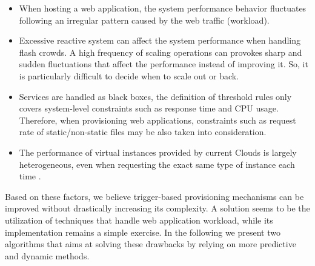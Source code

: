 \begin{itemize}
\item  When hosting a web application, the system performance behavior fluctuates following an irregular pattern caused by the web traffic (workload). 


\item Excessive reactive system can affect the system performance when handling flash crowds. A high frequency of scaling operations can provokes sharp and sudden fluctuations that affect the performance instead of improving it. So, it is particularly difficult to decide when to scale out or back. 

\item Services are handled as black boxes, the definition of threshold rules only covers system-level constraints such as response time and CPU usage. Therefore, when provisioning web applications, constraints such as request rate of static/non-static files may be also taken into consideration.



\item The performance of virtual instances provided by current Clouds is largely heterogeneous, even when requesting the exact same type of instance each time \cite{ec2Performance}. 


\end{itemize}

Based on these factors, we believe trigger-based provisioning mechanisms can be improved without drastically increasing its complexity. A solution seems to be the utilization of techniques that handle web application workload, while its implementation remains a simple exercise. In the following we present two algorithms that aims at solving these drawbacks by relying on more predictive and dynamic methods.

